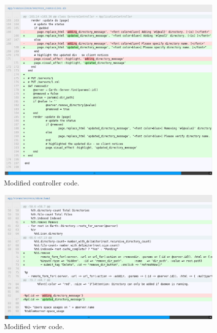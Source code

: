 \documentclass[10pt,a4,oneside]{article}
\begin{document}
\begin{figure}[h!]
\begin{centering}
\includegraphics[width=150mm]{figs/earthcontroller}
\end{centering}
\caption{Modified controller code.}
\label{fig:earthcontroller}
\end{figure}


\begin{figure}[h!]
\begin{centering}
\includegraphics[width=150mm]{figs/earthview}
\end{centering}
\caption{Modified view code.}
\label{fig:earthview}
\end{figure}



\newpage
\end{document}
